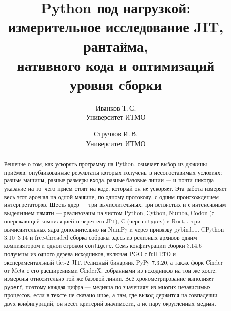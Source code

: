\documentclass[10pt,a4paper]{article}
\title{\textbf{Python под нагрузкой: измерительное исследование JIT, рантайма,\\
нативного кода и оптимизаций уровня сборки}}
\author{Иванков Т.\,С.\\ \small Университет ИТМО \and
        Стручков И.\,В.\\ \small Университет ИТМО}
\date{}
\newcommand{\code}[1]{\texttt{\small #1}}
\begin{document}
\maketitle
{\renewcommand{\thefootnote}{}}

\begin{abstract}
\noindent
Решение о том, как ускорять программу на Python, означает выбор из дюжины приёмов, опубликованные
результаты которых получены в несопоставимых условиях: разные машины, разные размеры входа,
разные базовые линии --- и почти никогда указание на то, чего приём стоит на коде, который он
не ускоряет. Эта работа измеряет весь этот арсенал на одной машине, по одному протоколу, с одним
происхождением интерпретаторов. Шесть ядер --- три вычислительных, три ветвистых и с интенсивным
выделением памяти --- реализованы на чистом Python, Cython, Numba, Codon (с опережающей
компиляцией и через его JIT), C (через \code{ctypes}) и Rust, а три вычислительных ядра
дополнительно на NumPy и через привязку pybind11. CPython 3.10--3.14 и free-threaded сборка собраны здесь из релизных архивов одним
компилятором и одной строкой \code{configure}. Семь конфигураций сборки 3.14.6 получены из одного
дерева исходников, включая PGO с full LTO и экспериментальный tier-2 JIT. Релизный бинарник
PyPy 7.3.20, а также форк Cinder от Meta с его расширениями CinderX, собранными из исходников на
том же хосте, измерены относительно той же базовой линии. Всё хронометрирование выполняет
\code{pyperf}, поэтому каждая цифра --- медиана по значениям из многих независимых процессов, если
в тексте не сказано иное, а
там, где вывод держится на совпадении двух конфигураций, он несёт критерий значимости, а не пару
округлённых медиан.


\end{abstract}
\end{document}
